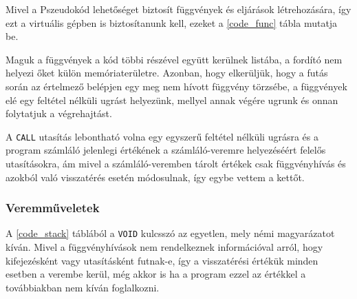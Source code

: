 Mivel a Pszeudokód lehetőséget biztosít függvények és eljárások létrehozására, így ezt a virtuális gépben is biztosítanunk kell, ezeket a \ref{code_func} tábla mutatja be.


Maguk a függvények a kód többi részével együtt kerülnek listába, a fordító nem helyezi őket külön memóriaterületre. Azonban, hogy elkerüljük, hogy a futás során az értelmező belépjen egy meg nem hívott függvény törzsébe, a függvények elé egy feltétel nélküli ugrást helyezünk, mellyel annak végére ugrunk és onnan folytatjuk a végrehajtást.

A \texttt{CALL} utasítás lebontható volna egy egyszerű feltétel nélküli ugrásra és a program számláló jelenlegi értékének a számláló-veremre helyezéséért felelős utasításokra, ám mivel a számláló-veremben tárolt értékek csak függvényhívás és azokból való visszatérés esetén módosulnak, így egybe vettem a kettőt.

\subsubsection{Veremműveletek}


A \ref{code_stack} táblából a \texttt{VOID} kulcsszó az egyetlen, mely némi magyarázatot kíván. Mivel a függvényhívások nem rendelkeznek információval arról, hogy kifejezésként vagy utasításként futnak-e, így a visszatérési értékük minden esetben a verembe kerül, még akkor is ha a program ezzel az értékkel a továbbiakban nem kíván foglalkozni.

